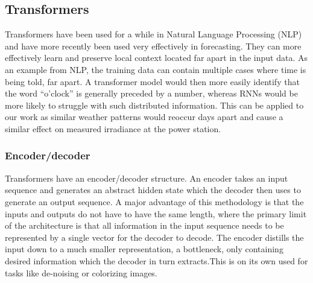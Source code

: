 


\subsection{Transformers}
 
 
Transformers have been used for a while in Natural Language Processing (NLP) and have more recently been used very effectively in forecasting.\cite{vaswani_attention_2017} They can more effectively learn and preserve local context located far apart in the input data. As an example from NLP, the training data can contain multiple cases where time is being told, far apart. A transformer model would then more easily identify that the word “o’clock” is generally preceded by a number, whereas RNNs would be more likely to struggle with such distributed information. This can be applied to our work as similar weather patterns would reoccur days apart and cause a similar effect on measured irradiance at the power station.


\subsubsection{Encoder/decoder}
Transformers have an encoder/decoder structure. An encoder takes an input sequence and generates an abstract hidden state which the decoder then uses to generate an output sequence. A major advantage of this methodology is that the inputs and outputs do not have to have the same length, where the primary limit of the architecture is that all information in the input sequence needs to be represented by a single vector for the decoder to decode. The encoder distills the input down to a much smaller representation, a bottleneck, only containing desired information which the decoder in turn extracts.This is on its own used for tasks like de-noising or colorizing images. 

